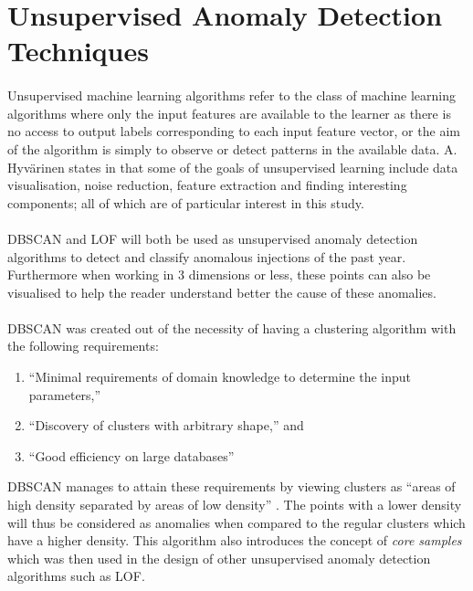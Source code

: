 \section{Unsupervised Anomaly Detection Techniques}

\paragraph{ }Unsupervised machine learning algorithms refer to the class of machine learning algorithms where only the input features are available to the learner as there is no access to output labels corresponding to each input feature vector, or the aim of the algorithm is simply to observe or detect patterns in the available data. A. Hyv\"{a}rinen states in \cite{Hyvarinen2015} that some of the goals of unsupervised learning include data visualisation, noise reduction, feature extraction and finding interesting components; all of which are of particular interest in this study.

\paragraph{ }\ac{DBSCAN} and \ac{LOF} will both be used as unsupervised anomaly detection algorithms to detect and classify anomalous injections of the past year. Furthermore when working in 3 dimensions or less, these points can also be visualised to help the reader understand better the cause of these anomalies. 

\paragraph{ }\acs{DBSCAN} was created out of the necessity of having a clustering algorithm with the following requirements:
\begin{enumerate}
	\item ``Minimal requirements of domain knowledge to determine the input parameters,''
	\item ``Discovery of clusters with arbitrary shape,'' and
	\item ``Good efficiency on large databases'' \cite{Ester1996}
\end{enumerate}
\acs{DBSCAN} manages to attain these requirements by viewing clusters as ``areas of high density separated by areas of low density'' \cite{Sklearn2}. The points with a lower density will thus be considered as anomalies when compared to the regular clusters which have a higher density. This algorithm also introduces the concept of \textit{core samples} which was then used in the design of other unsupervised anomaly detection algorithms such as \acs{LOF}. 

